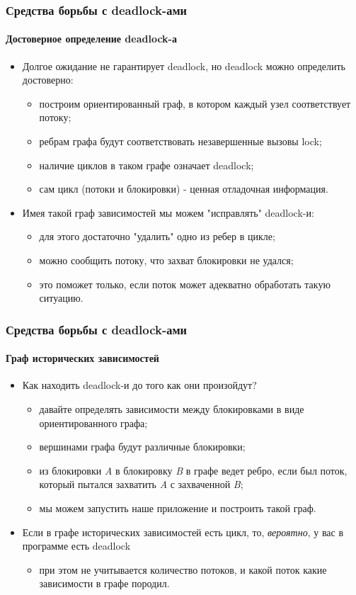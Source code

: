 \begin{frame}
\frametitle{Средства борьбы с deadlock-ами}
\framesubtitle{Достоверное определение deadlock-а}
\begin{itemize}
  \item Долгое ожидание не гарантирует deadlock, но deadlock можно определить
  достоверно:
  \begin{itemize}
    \item построим ориентированный граф, в котором каждый узел соответствует
    потоку;
    \item ребрам графа будут соответствовать незавершенные вызовы lock;
    \item наличие циклов в таком графе означает deadlock;
    \item сам цикл (потоки и блокировки) - ценная отладочная информация.
  \end{itemize}
  \item Имея такой граф зависимостей мы можем "исправлять" deadlock-и:
  \begin{itemize}
    \item для этого достаточно "удалить" одно из ребер в цикле;
    \item можно сообщить потоку, что захват блокировки не удался;
    \item это поможет только, если поток может адекватно обработать такую
    ситуацию.
  \end{itemize}
\end{itemize}
\end{frame}

\begin{frame}
\frametitle{Средства борьбы с deadlock-ами}
\framesubtitle{Граф исторических зависимостей}
\begin{itemize}
  \item Как находить deadlock-и до того как они произойдут?
  \begin{itemize}
    \item давайте определять зависимости между блокировками в виде
    ориентированного графа;
    \item вершинами графа будут различные блокировки;
    \item из блокировки \emph{A} в блокировку \emph{B} в графе  ведет ребро,
    если был поток, который пытался захватить \emph{A} с захваченной \emph{B};
    \item мы можем запустить наше приложение и построить такой граф.
  \end{itemize}
  \item Если в графе исторических зависимостей есть цикл, то, \emph{вероятно},
  у вас в программе есть deadlock
  \begin{itemize}
    \item при этом не учитывается количество потоков, и какой поток какие
    зависимости в графе породил.
  \end{itemize}
\end{itemize}
\end{frame}

